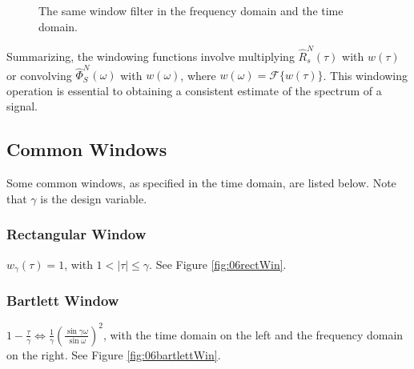 \documentclass[lecture,12pt,]{pcms-l}
\theoremstyle{example}
\newcommand{\w}{\omega}
\begin{document}
\begin{figure}[ht!]
	\centering
	 \hfill
	\caption{The same window filter in the  frequency domain and the  time domain.}
	\label{fig:06windowfilter}
\end{figure}

Summarizing, the windowing functions involve multiplying $\hat{R}_s^N(\tau)$ with $w(\tau)$ or convolving $\hat{\Phi}_S^N(\w)$ with $w(\w)$, where $w(\w)=\mathcal{F}\{w(\tau)\}$. This windowing operation is essential to obtaining a consistent estimate of the spectrum of a signal.

\subsection{Common Windows}
Some common windows, as specified in the time domain, are listed below. Note that $\gamma$ is the design variable.

\subsubsection{Rectangular Window}
$w_\gamma(\tau) = 1$, with $1<|\tau|\leq\gamma$. See Figure \ref{fig:06rectWin}.

\subsubsection{Bartlett Window}
$1-\frac{\tau}{\gamma} \Leftrightarrow \frac{1}{\gamma}\left(\frac{\sin\gamma\w}{\sin\w}\right)^2$, with the time domain on the left and the frequency domain on the right. See Figure \ref{fig:06bartlettWin}.
\end{document}
